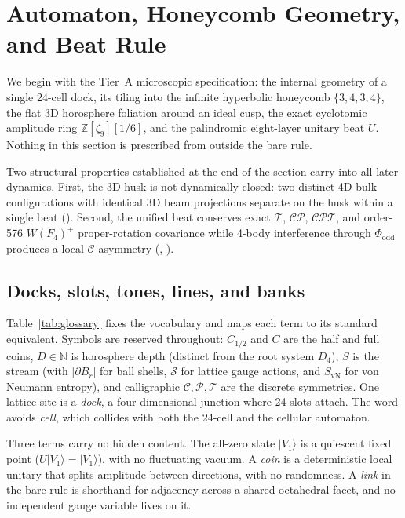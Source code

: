 \section{Automaton, Honeycomb Geometry, and Beat Rule}
\label{sec:one-rule}

We begin with the Tier~A microscopic specification: the internal geometry of a single 24-cell dock, its tiling into
the infinite hyperbolic honeycomb $\{3,4,3,4\}$, the flat 3D horosphere foliation around an ideal cusp, the exact
cyclotomic amplitude ring $\mathbb{Z}[\zeta_9][1/6]$, and the palindromic eight-layer unitary beat $U$. Nothing in this
section is prescribed from outside the bare rule.

Two structural properties established at the end of the section carry into all later dynamics. First, the 3D husk is
not dynamically closed: two distinct 4D bulk configurations with identical 3D beam projections separate on the husk
within a single beat (). Second, the unified beat conserves exact $\mathcal{T}$, $\mathcal{CP}$,
$\mathcal{CPT}$, and order-576 $W(F_4)^+$ proper-rotation covariance while 4-body interference through
$\Phi_{\mathrm{odd}}$ produces a local $\mathcal{C}$-asymmetry (\universecode, ).

\subsection{Docks, slots, tones, lines, and banks}

Table~\ref{tab:glossary} fixes the vocabulary and maps each term to its standard equivalent. Symbols are reserved
throughout: $C_{1/2}$ and $C$ are the half and full coins, $D \in \mathbb{N}$ is horosphere depth (distinct from the
root system $D_4$), $S$ is the stream (with $|\partial B_r|$ for ball shells, $\mathcal{S}$ for lattice gauge actions,
and $S_{\mathrm{vN}}$ for von Neumann entropy), and calligraphic $\mathcal{C}, \mathcal{P}, \mathcal{T}$ are the
discrete symmetries. One lattice site is a \emph{dock}, a four-dimensional junction where 24 slots attach. The word
avoids \emph{cell}, which collides with both the 24-cell and the cellular automaton.

Three terms carry no hidden content. The all-zero state $|V_1\rangle$ is a quiescent fixed point
($U|V_1\rangle = |V_1\rangle$), with no fluctuating vacuum. A \emph{coin} is a deterministic local unitary that splits
amplitude between directions, with no randomness. A \emph{link} in the bare rule is shorthand for adjacency across a
shared octahedral facet, and no independent gauge variable lives on it.

